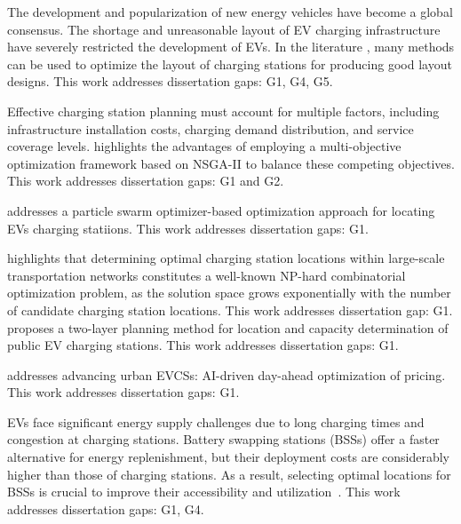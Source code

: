 \documentclass[letterpaper, 12pt, oneside, doublespacing]{Thesis}
\begin{document}
\noindent The development and popularization of new energy vehicles have become a global consensus. The shortage and unreasonable layout of EV charging infrastructure have severely restricted the development of EVs. In the literature \cite{a_multi-objective_2024}, many methods can be used to optimize the layout of charging stations for producing good layout designs. This work addresses dissertation gaps: G1, G4, G5.



\noindent Effective charging station planning must account for multiple factors, including infrastructure installation costs, charging demand distribution, and service coverage levels. \cite{a_multi-objective_2024} highlights the advantages of employing a multi-objective optimization framework based on NSGA-II to balance these competing objectives. This work addresses dissertation gaps: G1 and G2.


\noindent \cite{a_particle_2024} addresses a particle swarm optimizer-based optimization approach for locating EVs charging statiions. This work addresses dissertation gaps: G1.



\noindent \cite{a_quantum_2024} highlights that determining optimal charging station locations within large-scale transportation networks constitutes a well-known NP-hard combinatorial optimization problem, as the solution space grows exponentially with the number of candidate charging station locations. This work addresses dissertation gap: G1. \cite{allocate_electric_2024} proposes a two-layer planning method for location and capacity determination of public EV charging stations. This work addresses dissertation gaps: G1.



\noindent \cite{a_multi-objective_2024} addresses advancing urban EVCSs: AI-driven day-ahead optimization of pricing. This work addresses dissertation gaps: G1.



\noindent EVs face significant energy supply challenges due to long charging times and congestion at charging stations. Battery swapping stations (BSSs) offer a faster alternative for energy replenishment, but their deployment costs are considerably higher than those of charging stations. As a result, selecting optimal locations for BSSs is crucial to improve their accessibility and utilization~\cite{battery_swapping_2024}. This work addresses dissertation gaps: G1, G4.
\end{document}
